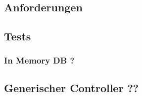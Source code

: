\subsection{Anforderungen}
\subsection{Tests }
\subsubsection{In Memory DB ?}
\subsection{Generischer Controller ??}
 